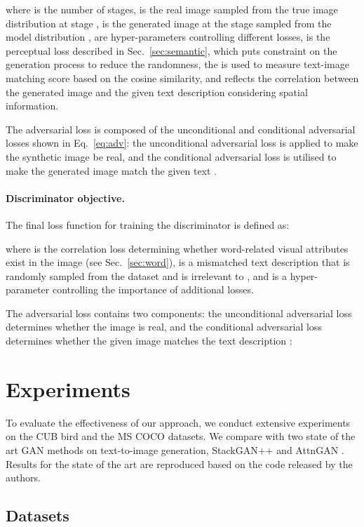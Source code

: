 \documentclass{article}
\begin{document}
where  is the number of stages,  is the real image sampled from the true image distribution  at stage ,  is the generated image at the  stage sampled from the model distribution ,  are hyper-parameters controlling different losses,  is the perceptual loss described in Sec.~\ref{sec:semantic}, which puts constraint on the generation process to reduce the randomness, the  \cite{xu2018attngan} is used to measure text-image matching score based on the cosine similarity, and  reflects the correlation between the generated image and the given text description considering spatial information.

The adversarial loss  is composed of the unconditional and conditional adversarial losses shown in Eq.~\eqref{eq:adv}: the unconditional adversarial loss is applied to make the synthetic image be real, and the conditional adversarial loss is utilised to make the generated image match the given text .


\paragraph{Discriminator objective.} The final loss function for training the discriminator  is defined as:

where  is the correlation loss determining whether word-related visual attributes exist in the image (see Sec.~\ref{sec:word}),  is a mismatched text description that is randomly sampled from the dataset and is irrelevant to , and  is a hyper-parameter controlling the importance of additional losses.

The adversarial loss  contains two components: the unconditional adversarial loss determines whether the image is real, and the conditional adversarial loss determines whether the given image matches the text description :


\section{Experiments}
\label{experiments}

To evaluate the effectiveness of our approach, we conduct extensive experiments on the CUB bird \citep{wah2011caltech} and the MS COCO \citep{lin2014microsoft} datasets.
We compare with two state of the art GAN methods on text-to-image generation, StackGAN++ \cite{zhang2018stackgan++} and AttnGAN \cite{xu2018attngan}.
Results for the state of the art are reproduced based on the code released by the authors.

\subsection{Datasets}
\end{document}
